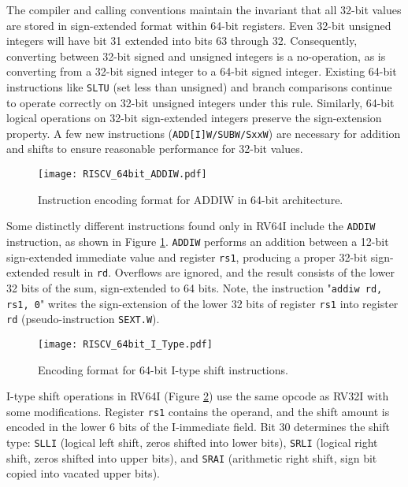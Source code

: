 The compiler and calling conventions maintain the invariant that all 32-bit values are stored in sign-extended format within 64-bit registers. Even 32-bit unsigned integers will have bit 31 extended into bits 63 through 32. Consequently, converting between 32-bit signed and unsigned integers is a no-operation, as is converting from a 32-bit signed integer to a 64-bit signed integer. Existing 64-bit instructions like \texttt{SLTU} (set less than unsigned) and branch comparisons continue to operate correctly on 32-bit unsigned integers under this rule. Similarly, 64-bit logical operations on 32-bit sign-extended integers preserve the sign-extension property. A few new instructions (\texttt{ADD[I]W/SUBW/SxxW}) are necessary for addition and shifts to ensure reasonable performance for 32-bit values.

\begin{figure}[h!]
    \centering
    \texttt{[image: RISCV\_64bit\_ADDIW.pdf]}
    \caption{Instruction encoding format for ADDIW in 64-bit architecture. \cite{riscv:manual:user:2024}}
    \label{fig:addiw_format}
\end{figure}

Some distinctly different instructions found only in RV64I include the \texttt{ADDIW} instruction, as shown in Figure \ref{fig:addiw_format}. \texttt{ADDIW} performs an addition between a 12-bit sign-extended immediate value and register \texttt{rs1}, producing a proper 32-bit sign-extended result in \texttt{rd}. Overflows are ignored, and the result consists of the lower 32 bits of the sum, sign-extended to 64 bits. Note, the instruction "\texttt{addiw rd, rs1, 0}" writes the sign-extension of the lower 32 bits of register \texttt{rs1} into register \texttt{rd} (pseudo-instruction \texttt{SEXT.W}).

\begin{figure}[h!]
    \centering
    \texttt{[image: RISCV\_64bit\_I\_Type.pdf]}
    \caption{Encoding format for 64-bit I-type shift instructions. \cite{riscv:manual:user:2024}}
    \label{fig:rv64i_shift_i_format}
\end{figure}

I-type shift operations in RV64I (Figure \ref{fig:rv64i_shift_i_format}) use the same opcode as RV32I with some modifications. Register \texttt{rs1} contains the operand, and the shift amount is encoded in the lower 6 bits of the I-immediate field. Bit 30 determines the shift type: \texttt{SLLI} (logical left shift, zeros shifted into lower bits), \texttt{SRLI} (logical right shift, zeros shifted into upper bits), and \texttt{SRAI} (arithmetic right shift, sign bit copied into vacated upper bits).

